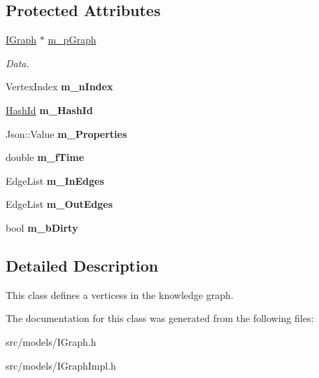\subsection*{Protected Attributes}
\begin{DoxyCompactItemize}
\item 
\mbox{\label{class_i_graph_1_1_i_vertex_a3b1cf7a46d91d0af5139560b3a0b90ce}} 
\hyperlink{class_i_graph}{I\+Graph} $\ast$ \hyperlink{class_i_graph_1_1_i_vertex_a3b1cf7a46d91d0af5139560b3a0b90ce}{m\+\_\+p\+Graph}
\begin{DoxyCompactList}\small\item\em Data. \end{DoxyCompactList}\item 
\mbox{\label{class_i_graph_1_1_i_vertex_a9348c0642fc2eccb99b702e0c7b88ec2}} 
Vertex\+Index {\bfseries m\+\_\+n\+Index}
\item 
\mbox{\label{class_i_graph_1_1_i_vertex_ad1a8dd207aa6879eab2a08f4b46379b0}} 
\hyperlink{class_i_graph_a27d53eee7b0a7abc9fce6c28983d5446}{Hash\+Id} {\bfseries m\+\_\+\+Hash\+Id}
\item 
\mbox{\label{class_i_graph_1_1_i_vertex_afc6549354bf6d1f6aa5d735e37a315e0}} 
Json\+::\+Value {\bfseries m\+\_\+\+Properties}
\item 
\mbox{\label{class_i_graph_1_1_i_vertex_ae17ad409a99aead275570bbf12db2000}} 
double {\bfseries m\+\_\+f\+Time}
\item 
\mbox{\label{class_i_graph_1_1_i_vertex_a59070df2fa32eab3eb7e10f1f82875ed}} 
Edge\+List {\bfseries m\+\_\+\+In\+Edges}
\item 
\mbox{\label{class_i_graph_1_1_i_vertex_a8e5709430f3fe54144cdd93d1f68dfd4}} 
Edge\+List {\bfseries m\+\_\+\+Out\+Edges}
\item 
\mbox{\label{class_i_graph_1_1_i_vertex_a77f9bde47fca5d73af196c53be88c850}} 
bool {\bfseries m\+\_\+b\+Dirty}
\end{DoxyCompactItemize}


\subsection{Detailed Description}
This class defines a vertices\textquotesingle{}s in the knowledge graph. 

The documentation for this class was generated from the following files\+:\begin{DoxyCompactItemize}
\item 
src/models/I\+Graph.\+h\item 
src/models/I\+Graph\+Impl.\+h\end{DoxyCompactItemize}
